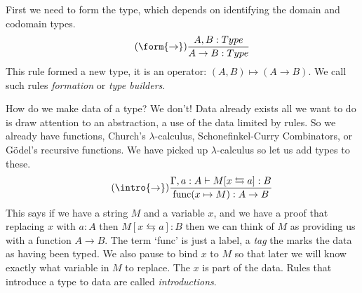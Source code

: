 First we need to form the type, which depends on identifying 
the domain and codomain types.
\begin{gather}
    \tag{$\form{\to}$}
    \frac{A,B:Type}{A\to B:Type}
\end{gather}
This rule formed a new type, it is an operator: 
$(A,B)\mapsto (A\to B)$.  We call such rules \emph{formation}
or \emph{type builders}.

How  do we make data of a type?  We don't!  Data already exists 
all we want to do is draw attention to an abstraction, a use 
of the data limited by rules.  So we already have functions,
Church's $\lambda$-calculus, Schonefinkel-Curry Combinators,
or G\"odel's recursive functions.  We have picked up 
$\lambda$-calculus so let us add types to these.
\begin{gather}
    \tag{$\intro{\to}$}
    \frac{
        \Gamma, a:A \vdash M[x\leftrightarrows a]:B
    }{
        \text{func}(x\mapsto M):A\to B
    }
\end{gather}
This says if we have a string $M$ and a variable $x$, 
and we have a proof that replacing $x$ with $a:A$ then 
$M[x\leftrightarrows a]:B$ then we can think of 
$M$ as providing us with a function $A\to B$.
The term `func' is just a label, a \emph{tag} the 
marks the data as having been typed.  We also 
pause to bind $x$ to $M$ so that later we will know exactly 
what variable in $M$ to replace.  The $x$ is part of the data.
Rules that introduce a type to data are called \emph{introductions}.

